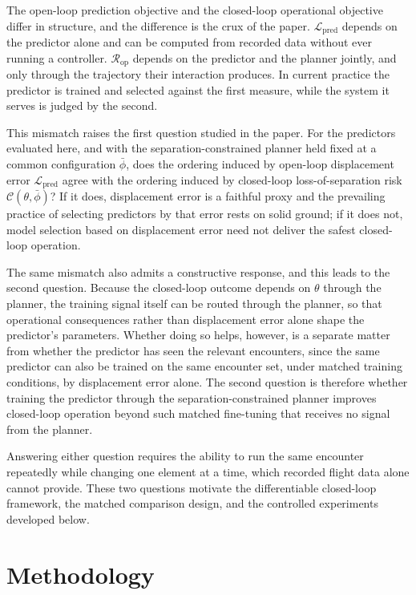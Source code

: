 \documentclass[11pt]{article}
\theoremstyle{plain}
\theoremstyle{definition}
\begin{document}
The open-loop prediction objective and the closed-loop operational
objective differ in structure, and the difference is the crux of the
paper.
$\mathcal{L}_{\mathrm{pred}}$ depends on the predictor alone and can be
computed from recorded data without ever running a controller.
$\mathcal{R}_{\mathrm{op}}$ depends on the predictor and the planner
jointly, and only through the trajectory their interaction produces. In
current practice the predictor is trained and selected against the first
measure, while the system it serves is judged by the second.
 
This mismatch raises the first question studied in the paper. For the
predictors evaluated here, and with the separation-constrained planner
held fixed at a common configuration $\bar{\phi}$, does the ordering
induced by open-loop displacement error $\mathcal{L}_{\mathrm{pred}}$
agree with the ordering induced by closed-loop loss-of-separation risk
$\mathcal{C}(\theta, \bar{\phi})$? If it does, displacement error is
a faithful proxy and the prevailing practice of selecting predictors by
that error rests on solid ground; if it does not, model selection based
on displacement error need not deliver the safest closed-loop operation.
 
The same mismatch also admits a constructive response, and this leads to
the second question. Because the closed-loop outcome depends on
$\theta$ through the planner, the training signal itself can be routed
through the planner, so that operational consequences rather than
displacement error alone shape the predictor's parameters. Whether doing
so helps, however, is a separate matter from whether the predictor has
seen the relevant encounters, since the same predictor can also be
trained on the same encounter set, under matched training conditions, by
displacement error alone. The second question is therefore whether
training the predictor through the separation-constrained planner
improves closed-loop operation beyond such matched fine-tuning that
receives no signal from the planner.
 
Answering either question requires the ability to run the same encounter
repeatedly while changing one element at a time, which recorded flight
data alone cannot provide. These two questions motivate the differentiable closed-loop framework,
the matched comparison design, and the controlled experiments developed below.
 

\section{Methodology}
\label{sec:method}
 
\end{document}
